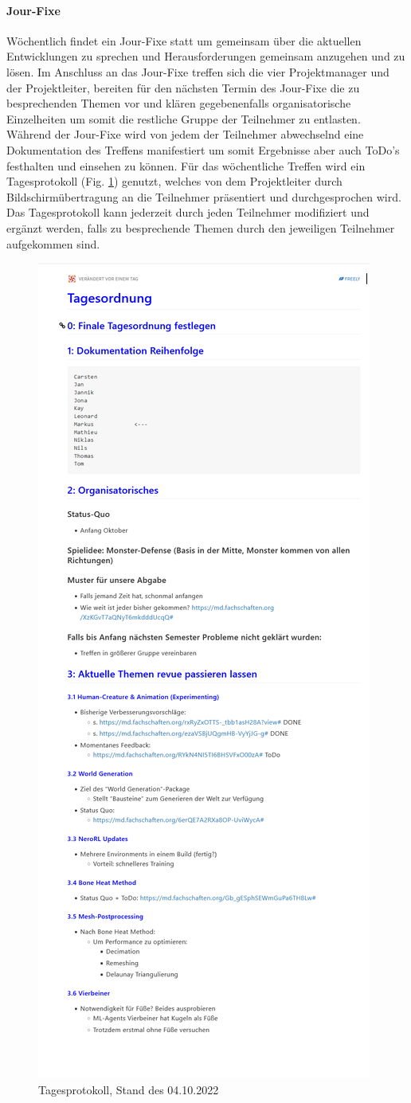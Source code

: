 \paragraph{Jour-Fixe}
Wöchentlich findet ein Jour-Fixe statt um gemeinsam über die aktuellen Entwicklungen zu sprechen und Herausforderungen gemeinsam anzugehen und zu lösen. Im Anschluss an das Jour-Fixe treffen sich die vier Projektmanager und der Projektleiter, bereiten für den nächsten Termin des Jour-Fixe die zu besprechenden Themen vor und klären gegebenenfalls organisatorische Einzelheiten um somit die restliche Gruppe der Teilnehmer zu entlasten. Während der Jour-Fixe wird von jedem der Teilnehmer abwechselnd eine Dokumentation des Treffens manifestiert um somit Ergebnisse aber auch ToDo's festhalten und einsehen zu können. Für das wöchentliche Treffen wird ein Tagesprotokoll (Fig. \ref{fig:Tagesprotokoll}) genutzt, welches von dem Projektleiter durch Bildschirmübertragung an die Teilnehmer präsentiert und durchgesprochen wird. Das Tagesprotokoll kann jederzeit durch jeden Teilnehmer modifiziert und ergänzt werden, falls zu besprechende Themen durch den jeweiligen Teilnehmer aufgekommen sind.

\begin{figure}[ht]
	\centering
	\includegraphics[width=0.5\linewidth]{resources/img/Tagesprotokoll_Beispiel.png}
	\caption{Tagesprotokoll, Stand des 04.10.2022}\label{fig:Tagesprotokoll}
\end{figure}

